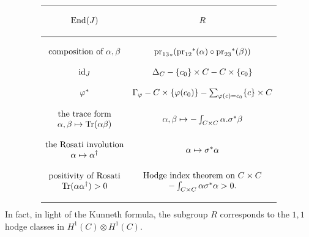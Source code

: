 $$
\begin{matrix}
\hline & \\
\text{End}(J) & R \\
& \\
\hline & \\
\text{composition of $\alpha, \beta$} &
{\text{pr}_{13}}_* ({\text{pr}_{12}}^*(\alpha) \circ {\text{pr}_{23}}^*(\beta))
\\
& \\
\text{id}_J &
\Delta_C - \{c_0\} \times C - C \times \{c_0\} \\
& \\
\varphi^* &
\Gamma_\varphi - C \times \{\varphi(c_0)\}
- \sum_{\varphi(c) = c_0} \{c\} \times C \\
& \\
{
\begin{matrix}
\text{the trace form} \\
\alpha, \beta \mapsto \text{Tr}(\alpha \beta)
\end{matrix}
}
&
\alpha, \beta \mapsto - \int_{C \times C} \alpha . \sigma^*\beta
\\
& \\
{
\begin{matrix}
\text{the Rosati involution} \\
\alpha \mapsto \alpha^\dagger
\end{matrix}
}
&
\alpha \mapsto \sigma^*\alpha
\\
& \\
{
\begin{matrix}
\text{positivity of Rosati} \\
\text{Tr}(\alpha\alpha^\dagger) > 0
\end{matrix}
}
&
{
\begin{matrix}
\text{Hodge index theorem on $C \times C$} \\
- \int_{C \times C} \alpha \sigma^*\alpha > 0.
\end{matrix}
}
\\
& \\
\hline
\end{matrix}
$$
In fact, in light of the Kunneth formula, the subgroup $R$ corresponds to the
$1, 1$ hodge classes in $H^1(C)\otimes H^1(C)$.

